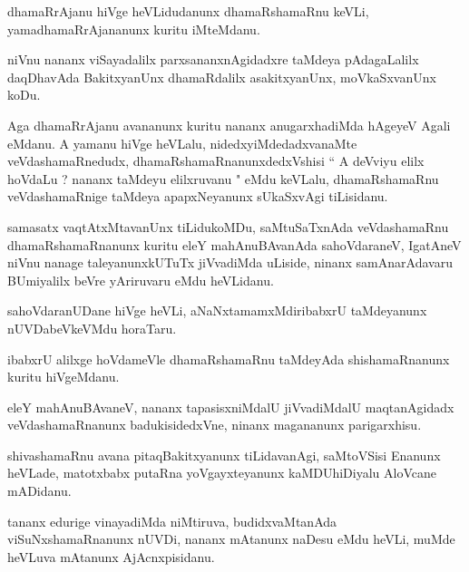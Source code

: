 \documentclass{article}
\begin{document}
\begin{mn}
dhamaRrAjanu hiVge heVLidudanunx dhamaRshamaRnu keVLi, yamadhamaRrAjananunx 
kuritu iMteMdanu.
\end{mn}

\begin{mn}
niVnu nananx viSayadalilx parxsananxnAgidadxre taMdeya pAdagaLalilx 
daqDhavAda BakitxyanUnx dhamaRdalilx asakitxyanUnx, moVkaSxvanUnx koDu.
\end{mn}

\begin{mn}
Aga dhamaRrAjanu avananunx kuritu nananx anugarxhadiMda hAgeyeV Agali eMdanu.
A yamanu hiVge heVLalu, nidedxyiMdedadxvanaMte veVdashamaRnedudx,
dhamaRshamaRnanunxdedxVshisi `` A deVviyu elilx hoVdaLu ? nananx taMdeyu
elilxruvanu " eMdu keVLalu, dhamaRshamaRnu veVdashamaRnige taMdeya apapxNeyanunx sUkaSxvAgi tiLisidanu.
\end{mn}

\begin{mn}
samasatx vaqtAtxMtavanUnx tiLidukoMDu, saMtuSaTxnAda veVdashamaRnu
dhamaRshamaRnanunx kuritu eleY mahAnuBAvanAda sahoVdaraneV, IgatAneV 
niVnu nanage taleyanunxkUTuTx jiVvadiMda uLiside, ninanx samAnarAdavaru
BUmiyalilx beVre yAriruvaru eMdu heVLidanu.
\end{mn}

\begin{mn}
sahoVdaranUDane hiVge heVLi, aNaNxtamamxMdiribabxrU taMdeyanunx 
nUVDabeVkeVMdu horaTaru.
\end{mn}

\begin{mn}
ibabxrU alilxge hoVdameVle dhamaRshamaRnu taMdeyAda shishamaRnanunx 
kuritu hiVgeMdanu.
\end{mn}

\begin{mn}
eleY mahAnuBAvaneV, nananx tapasisxniMdalU jiVvadiMdalU maqtanAgidadx
veVdashamaRnanunx badukisidedxVne, ninanx magananunx parigarxhisu.
\end{mn}

\begin{mn}
shivashamaRnu avana pitaqBakitxyanunx tiLidavanAgi, saMtoVSisi Enanunx 
heVLade, matotxbabx putaRna yoVgayxteyanunx kaMDUhiDiyalu AloVcane mADidanu.
\end{mn}

\begin{mn}
tananx edurige vinayadiMda niMtiruva, budidxvaMtanAda viSuNxshamaRnanunx
 nUVDi, nananx mAtanunx naDesu eMdu heVLi, muMde heVLuva mAtanunx 
 AjAcnxpisidanu.
\end{mn}
\end{document}
